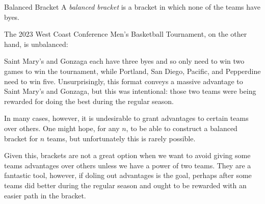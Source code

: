 {\begin{definition}{Balanced Bracket}{}
    A \textit{balanced bracket} is a bracket in which none of the teams have byes.
\end{definition} 

The 2023 West Coast Conference Men's Basketball Tournament, on the other hand, is unbalanced:

Saint Mary's and Gonzaga each have three byes and so only need to win two games to win the tournament, while Portland, San Diego, Pacific, and Pepperdine need to win five. Unsurprisingly, this format conveys a massive advantage to Saint Mary's and Gonzaga, but this was intentional: those two teams were being rewarded for doing the best during the regular season.

In many cases, however, it is undesirable to grant advantages to certain teams over others. One might hope, for any $n$, to be able to construct a balanced bracket for $n$ teams, but unfortunately this is rarely possible.


Given this, brackets are not a great option when we want to avoid giving some teams advantages over others unless we have a power of two teams. They are a fantastic tool, however, if doling out advantages is the goal, perhaps after some teams did better during the regular season and ought to be rewarded with an easier path in the bracket.
}